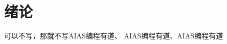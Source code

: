 \chapter{绪论} \label{chap:introduction}

可以不写，\textcolor[RGB]{202,12,22}{那就不写}\textcolor[RGB]{18,220,168}{AIAS编程有道}、
\textcolor[RGB]{202,12,22}{AIAS编程有道}、\textcolor[RGB]{1,8,9}{AIAS编程有道}

